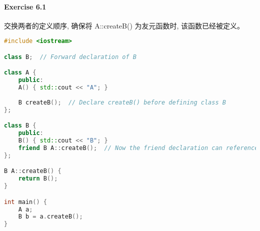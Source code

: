 \documentclass{article}
\begin{document}
	\paragraph*{Exercise 6.1} 
	
	交换两者的定义顺序, 确保将 A::createB() 为友元函数时, 该函数已经被定义。
	
	\begin{lstlisting}[language=C++]
#include <iostream>

class B;  // Forward declaration of B

class A {
	public:
	A() { std::cout << "A"; }
	
	B createB();  // Declare createB() before defining class B
};

class B {
	public:
	B() { std::cout << "B"; }
	friend B A::createB();  // Now the friend declaration can reference A::createB()
};

B A::createB() {
	return B();
}

int main() {
	A a;
	B b = a.createB();
}

	\end{lstlisting}
	 
\end{document}
